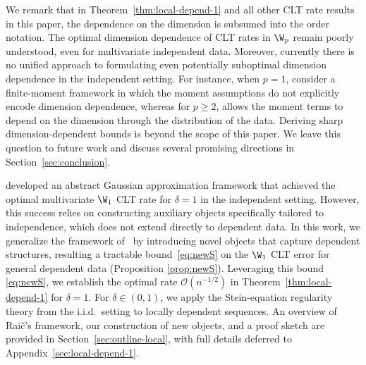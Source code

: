 \documentclass[mnsc,nonblindrev]{informs3}
\begin{document}
We remark that in Theorem~\ref{thm:local-depend-1} and all other CLT rate results in this paper, the dependence on the dimension is subsumed into the order notation. The optimal dimension dependence of CLT rates in \(\W_p\) remain poorly understood, even for multivariate independent data. Moreover, currently there is no unified approach to formulating even potentially suboptimal dimension dependence in the independent setting. For instance, when \(p=1\), \cite{gallouet2018regularity} consider a finite-moment framework in which the moment assumptions do not explicitly encode dimension dependence, whereas for \(p\ge 2\), \cite{bonis2020stein} allows the moment terms to depend on the dimension through the distribution of the data. Deriving sharp dimension-dependent bounds is beyond the scope of this paper. We leave this question to future work and discuss several promising directions in Section~\ref{sec:conclusion}.


\cite{raivc2018multivariate} developed an abstract Gaussian approximation framework that achieved the optimal multivariate $\W_1$ CLT rate for $\delta=1$ in the independent
setting. However, this success relies on constructing auxiliary objects specifically tailored to independence, which does not extend directly to dependent data. In this work, we generalize the framework of~\cite{raivc2018multivariate} by introducing novel objects that capture dependent structures, resulting a tractable bound~\eqref{eq:newS} on the $\W_1$ CLT error for general dependent data (Proposition \ref{prop:newS}). Leveraging this bound \eqref{eq:newS}, we
establish the optimal rate $\mathcal{O}(n^{-1/2})$ in Theorem~\ref{thm:local-depend-1} for
$\delta=1$. For $\delta\in(0,1)$, we apply the Stein-equation regularity theory
\citep{gallouet2018regularity} from the i.i.d.\ setting to locally dependent sequences.
An overview of Rai\v{c}'s framework, our construction of new objects, and a proof sketch are provided in
Section~\ref{sec:outline-local}, with full details deferred to Appendix~\ref{sec:local-depend-1}.
\end{document}
